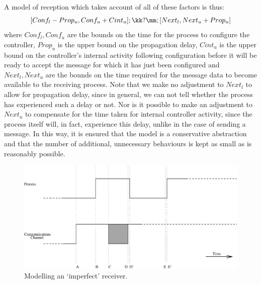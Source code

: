 A model of reception which takes account of all of these factors is thus:
\[
[Conf_l - Prop_u, Conf_u + Cint_u] ; \kk?\mm ; [Next_l, Next_u + Prop_u]
\]
where $Conf_l, Conf_u$ are the bounds on the time for the process to configure
the controller, $Prop_u$ is the upper bound on the propagation delay, $Cint_u$
is the upper bound on the controller's internal activity following 
configuration before it will be ready to accept the message for which it has
just been configured and $Next_l, Next_u$ are the bounds on the time required
for the message data to become available to the receiving process. Note that
we make no adjustment to $Next_l$ to allow for propagation delay, since
in general, we can not tell whether the process has experienced such a delay
or not. Nor is it possible to make an adjustment to $Next_u$ to 
compensate for the time taken for internal controller activity, since the
process itself will, in fact, experience this delay, unlike in the case of
sending a message. In this way, it is ensured that the model is a 
conservative abstraction and that the number of additional, unnecessary
behaviours is kept as small as is reasonably possible. 


\begin{figure}
\begin{center}
\includegraphics[width=.75\linewidth]{PRACTICE/imprcv.eps}
\caption{Modelling an `imperfect' receiver.\label{fig:imprcv}}
\end{center}
\end{figure}
